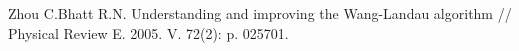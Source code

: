 \begin{thebibliography}{111}
Zhou C.Bhatt R.N. Understanding and improving the Wang-Landau algorithm // Physical Review E. 2005. V. 72(2): p. 025701.





\end{thebibliography} 